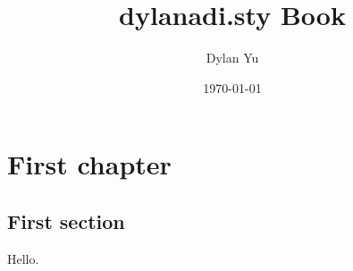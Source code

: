 \documentclass[paper=6.125in:8.25in,twoside,openany,pagesize=pdftex,10pt]{scrbook}
\title{dylanadi.sty Book}
\author{Dylan Yu}
\date{\today}
\begin{document}
\begingroup %
\notofont
\color{\secondcolor}
\let\newpage\relax%
\dylantitle
\endgroup

\newpage

\tableofcontents

\chapter{First chapter}
\section{First section}
Hello.
\end{document}

